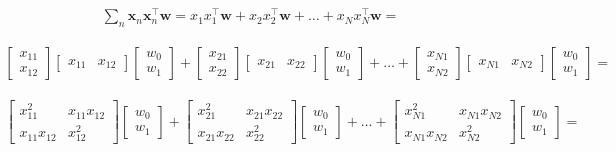 \documentclass[10pt]{article}
\begin{document}
\begin{enumerate}
\begin{eqnarray*}
\sum_{n} \mathbf{x}_n \mathbf{x}_n ^\top \mathbf{w} =
	x_1x_1^\top \mathbf{w} + x_2x_2^\top \mathbf{w} + \dots + x_Nx_N^\top \mathbf{w} =
\end{eqnarray*}

\begin{eqnarray*}
	\begin{bmatrix}
	x_{11} \\[0.3em]
    x_{12}
	\end{bmatrix}
    \begin{bmatrix}
	x_{11} & x_{12}
	\end{bmatrix}
    \begin{bmatrix}
	w_0 \\[0.3em]
    w_1
	\end{bmatrix} +
    \begin{bmatrix}
	x_{21} \\[0.3em]
    x_{22}
	\end{bmatrix}
    \begin{bmatrix}
	x_{21} & x_{22}
	\end{bmatrix}
    \begin{bmatrix}
	w_0 \\[0.3em]
    w_1
	\end{bmatrix} +
    \dots +
    \begin{bmatrix}
	x_{N1} \\[0.3em]
    x_{N2}
	\end{bmatrix}
    \begin{bmatrix}
	x_{N1} & x_{N2}
	\end{bmatrix}
    \begin{bmatrix}
	w_0 \\[0.3em]
    w_1
	\end{bmatrix} =
\end{eqnarray*}

\begin{eqnarray*}
	\begin{bmatrix}
	x_{11}^2 & x_{11}x_{12} \\[0.3em]
    x_{11}x_{12} & x_{12}^2
	\end{bmatrix}
    \begin{bmatrix}
	w_0 \\[0.3em]
    w_1
	\end{bmatrix} +
    \begin{bmatrix}
	x_{21}^2 & x_{21}x_{22} \\[0.3em]
    x_{21}x_{22} & x_{22}^2
	\end{bmatrix}
    \begin{bmatrix}
	w_0 \\[0.3em]
    w_1
	\end{bmatrix} +
    \dots +
    \begin{bmatrix}
	x_{N1}^2 & x_{N1}x_{N2} \\[0.3em]
    x_{N1}x_{N2} & x_{N2}^2
	\end{bmatrix}
    \begin{bmatrix}
	w_0 \\[0.3em]
    w_1
	\end{bmatrix} =
\end{eqnarray*}


\end{enumerate}
\end{document}
